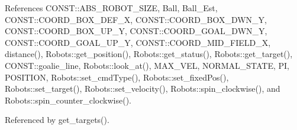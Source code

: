 References C\+O\+N\+S\+T\+::\+A\+B\+S\+\_\+\+R\+O\+B\+O\+T\+\_\+\+S\+I\+ZE, Ball, Ball\+\_\+\+Est, C\+O\+N\+S\+T\+::\+C\+O\+O\+R\+D\+\_\+\+B\+O\+X\+\_\+\+D\+E\+F\+\_\+X, C\+O\+N\+S\+T\+::\+C\+O\+O\+R\+D\+\_\+\+B\+O\+X\+\_\+\+D\+W\+N\+\_\+Y, C\+O\+N\+S\+T\+::\+C\+O\+O\+R\+D\+\_\+\+B\+O\+X\+\_\+\+U\+P\+\_\+Y, C\+O\+N\+S\+T\+::\+C\+O\+O\+R\+D\+\_\+\+G\+O\+A\+L\+\_\+\+D\+W\+N\+\_\+Y, C\+O\+N\+S\+T\+::\+C\+O\+O\+R\+D\+\_\+\+G\+O\+A\+L\+\_\+\+U\+P\+\_\+Y, C\+O\+N\+S\+T\+::\+C\+O\+O\+R\+D\+\_\+\+M\+I\+D\+\_\+\+F\+I\+E\+L\+D\+\_\+X, distance(), Robots\+::get\+\_\+position(), Robots\+::get\+\_\+status(), Robots\+::get\+\_\+target(), C\+O\+N\+S\+T\+::goalie\+\_\+line, Robots\+::look\+\_\+at(), M\+A\+X\+\_\+\+V\+EL, N\+O\+R\+M\+A\+L\+\_\+\+S\+T\+A\+TE, PI, P\+O\+S\+I\+T\+I\+ON, Robots\+::set\+\_\+cmd\+Type(), Robots\+::set\+\_\+fixed\+Pos(), Robots\+::set\+\_\+target(), Robots\+::set\+\_\+velocity(), Robots\+::spin\+\_\+clockwise(), and Robots\+::spin\+\_\+counter\+\_\+clockwise().



Referenced by get\+\_\+targets().


